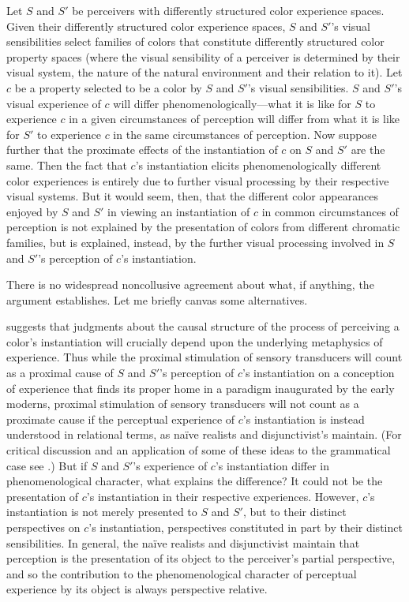 \documentclass[12pt]{article}
\begin{document}
Let \( S \) and \( S' \) be perceivers with differently structured color experience spaces. Given their differently structured color experience spaces, \( S \) and \( S' \)'s visual sensibilities select families of colors that constitute differently structured color property spaces (where the visual sensibility of a perceiver is determined by their visual system, the nature of the natural environment and their relation to it). Let \( c \) be a property selected to be a color by \( S \) and \( S' \)'s visual sensibilities. \( S \) and \( S' \)'s visual experience of \( c \) will differ phenomenologically---what it is like for \( S \) to experience \( c \) in a given circumstances of perception will differ from what it is like for \( S' \) to experience \( c \) in the same circumstances of perception. Now suppose further that the proximate effects of the instantiation of \( c \) on \( S \) and \( S' \) are the same. Then the fact that \( c \)'s instantiation elicits phenomenologically different color experiences is entirely due to further visual processing by their respective visual systems. But it would seem, then, that the different color appearances enjoyed by \( S \) and \( S' \) in viewing an instantiation of \( c \) in common circumstances of perception is not explained by the presentation of colors from different chromatic families, but is explained, instead, by the further visual processing involved in \( S \) and \( S' \)'s perception of \( c \)'s instantiation.

There is no widespread noncollusive agreement about what, if anything, the argument establishes. Let me briefly canvas some alternatives.

\citet{Kalderon:2007mr} suggests that judgments about the causal structure of the process of perceiving a color's instantiation will crucially depend upon the underlying metaphysics of experience. Thus while the proximal stimulation of sensory transducers will count as a proximal cause of \( S \) and \( S' \)'s perception of \( c \)'s instantiation on a conception of experience that finds its proper home in a paradigm inaugurated by the early moderns, proximal stimulation of sensory transducers will not count as a proximate cause if the perceptual experience of \( c \)'s instantiation is instead understood in relational terms, as naïve realists and disjunctivist's maintain. (For critical discussion and an application of some of these ideas to the grammatical case see \citealt{Longworth:2007aa}.) But if \( S \) and \( S' \)'s experience of \( c \)'s instantiation differ in phenomenological character, what explains the difference? It could not be the presentation of \( c \)'s instantiation in their respective experiences. However, \( c \)'s instantiation is not merely presented to \( S \) and \( S' \), but to their distinct perspectives on \( c \)'s instantiation, perspectives constituted in part by their distinct sensibilities. In general, the naïve realists and disjunctivist maintain that perception is the presentation of its object to the perceiver's partial perspective, and so the contribution to the phenomenological character of perceptual experience by its object is always perspective relative.
\end{document}

